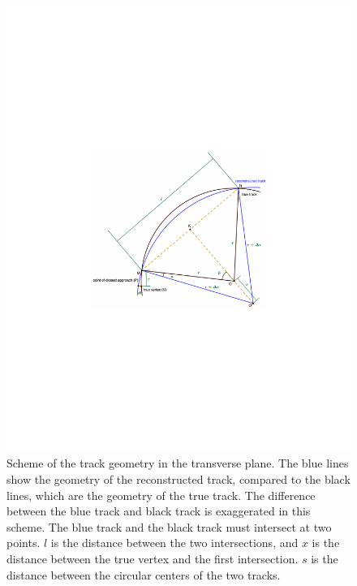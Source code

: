 \begin{figure}[!htb]
      \centering
      \includegraphics[width=\textwidth]{pics/muon_corr/GeoFit/d0_pt_geometry.pdf}
      \caption{Scheme of the track geometry in the transverse plane. 
               The blue lines show the geometry of the reconstructed track, 
               compared to the black lines, which are the geometry of the true track.
               The difference between the blue track and black track is exaggerated in this scheme.
               The blue track and the black track must intersect at two points.
               $l$ is the distance between the two intersections, 
               and $x$ is the distance between the true vertex and the first intersection.
               $s$ is the distance between the circular centers of the two tracks.}
      \label{fig:d0_pt_scheme}
\end{figure}

